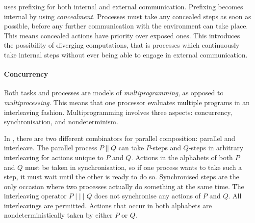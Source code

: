 \CSP uses prefixing for both internal and external communication.
Prefixing becomes internal by using \emph{concealment}.
Processes must take any concealed steps as soon as possible, before any further communication with the environment can take place.
This means concealed actions have priority over exposed ones.
This introduces the possibility of diverging computations, that is processes which continuously take internal steps without ever being able to engage in external communication.






\paragraph{Concurrency}

Both tasks and processes are models of \emph{multiprogramming}, as opposed to \emph{multiprocessing}.
This means that one processor evaluates multiple programs in an interleaving fashion.
Multiprogramming involves three aspects: concurrency, synchronisation, and nondeterminism.

In \CSP, there are two different combinators for parallel composition: parallel and interleave.
The parallel process $P \parallel Q$ can take $P$-steps and $Q$-steps in arbitrary interleaving for actions unique to $P$ and $Q$.
Actions in the alphabets of both $P$ and $Q$ must be taken in synchronisation, so if one process wants to take such a step, it must wait until the other is ready to do so.
Synchronised steps are the only occasion where two processes actually do something at the same time.
%
The interleaving operator $P \mid\mid\mid Q$ does not synchronise any actions of $P$ and $Q$.
All interleavings are permitted.
Actions that occur in both alphabets are nondeterministically taken by either $P$ or $Q$.



